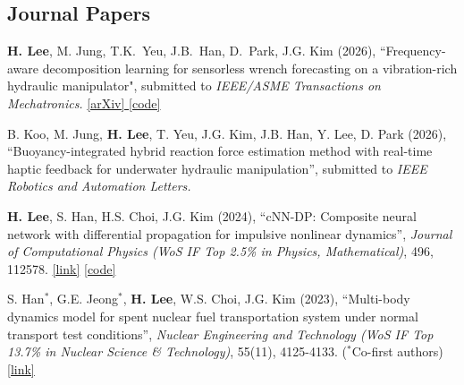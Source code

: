 \documentclass[a4paper,10pt]{extarticle}
\begin{document}
\subsection*{Journal Papers}
\begin{etaremune}[leftmargin=.5cm, itemsep=0.05cm]
	\item \textbf{H. Lee}, M. Jung, T.K.~Yeu, J.B.~Han, D.~Park, J.G. Kim (2026), ``Frequency-aware decomposition learning for sensorless wrench forecasting on a vibration-rich hydraulic manipulator", submitted to \textit{IEEE/ASME Transactions on Mechatronics.} \href{https://arxiv.org/abs/2604.12905}{[arXiv] \href{https://github.com/leehyeonbeen/FDN}{[code]}}

	\item B. Koo, M. Jung, \textbf{H. Lee}, T. Yeu, J.G. Kim, J.B. Han, Y. Lee, D. Park (2026), “Buoyancy-integrated hybrid reaction force estimation method with real-time haptic feedback for underwater hydraulic manipulation”, submitted to \textit{IEEE Robotics and Automation Letters.} %

	\item \textbf{H. Lee}, S. Han, H.S. Choi, J.G. Kim (2024), “cNN-DP: Composite neural network with differential propagation for impulsive nonlinear dynamics”, \textit{Journal of Computational Physics (WoS IF Top 2.5\% in Physics, Mathematical)}, 496, 112578. \href{https://www.sciencedirect.com/science/article/pii/S0021999123006733}{[link]} \href{https://github.com/leehyeonbeen/cNN-DP}{[code]}

	\item S. Han$^*$, G.E. Jeong$^*$, \textbf{H. Lee}, W.S. Choi, J.G. Kim (2023), “Multi-body dynamics model for spent nuclear fuel transportation system under normal transport test conditions”, \textit{Nuclear Engineering and Technology (WoS IF Top 13.7\% in Nuclear Science \& Technology)}, 55(11), 4125-4133. {\small ($^*$Co-first authors)} \href{https://www.sciencedirect.com/science/article/pii/S1738573323003492}{[link]}
\end{etaremune}

\vspace*{-0.6cm}
\end{document}
